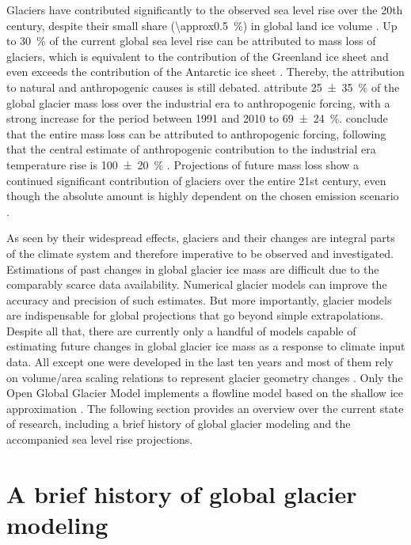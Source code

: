     Glaciers have contributed significantly to the observed sea level rise over the 20th century, despite their small share (\SI{\approx0.5}{\percent}) in global land ice volume \citep[e.g.,][]{Marzeion2015, Bamber_2018}. Up to \SI{30}{\percent} of the current global sea level rise can be attributed to mass loss of glaciers, which is equivalent to the contribution of the Greenland ice sheet and even exceeds the contribution of the Antarctic ice sheet \citep{Zemp2019}. Thereby, the attribution to natural and anthropogenic causes is still debated. \citet{Marzeion2014a} attribute 25\SI{\pm35}{\percent} of the global glacier mass loss over the industrial era to anthropogenic forcing, with a strong increase for the period between 1991 and 2010 to 69\SI{\pm24}{\percent}. \citet{Roe2020} conclude that the entire mass loss can be attributed to anthropogenic forcing, following that the central estimate of anthropogenic contribution to the industrial era temperature rise is 100\SI{\pm20}{\percent} \citep{Allen2018}. Projections of future mass loss show a continued significant contribution of glaciers over the entire 21st century, even though the absolute amount is highly dependent on the chosen emission scenario \citep{Hock2019a, Marzeion2020}.

    As seen by their widespread effects, glaciers and their changes are integral parts of the climate system and therefore imperative to be observed and investigated. Estimations of past changes in global glacier ice mass are difficult due to the comparably scarce data availability. Numerical glacier models can improve the accuracy and precision of such estimates. But more importantly, glacier models are indispensable for global projections that go beyond simple extrapolations. Despite all that, there are currently only a handful of models capable of estimating future changes in global glacier ice mass as a response to climate input data. All except one were developed in the last ten years and most of them rely on volume/area scaling relations to represent glacier geometry changes \citep[e.g.,][]{VanDeWal2001,Marzeion2012b,Radic2014a}. Only the Open Global Glacier Model \citep[OGGM,][]{Maussion2019} implements a flowline model based on the shallow ice approximation \citep[SIA e.g.,][]{Hutter1983}. The following section provides an overview over the current state of research, including a brief history of global glacier modeling and the accompanied sea level rise projections.


\section{A brief history of global glacier modeling} %
\label{sec:history_of_glacier_modeling}
    
